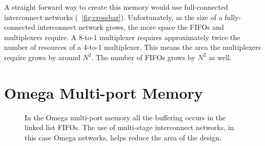     A straight forward way to create this memory would use full-connected interconnect networks (\figurename~\ref{fig:crossbar}). Unfortunately, as the size of a fully-connected interconnect network grows, the more space the FIFOs and multiplexers require. A 8-to-1 multiplexer requires approximately twice the number of resources of a 4-to-1 multiplexer. This means the area the multiplexers require grows by around $N^2$. The number of FIFOs grows by $N^2$ as well.

\section{Omega Multi-port Memory}
    \begin{figure}
        \center
        \caption[The Omega multi-port memory.]{In the Omega multi-port memory all the buffering occurs in the linked list FIFOs. The use of multi-stage interconnect networks, in this case Omega networks, helps reduce the area of the design.}
        \label{fig:versionb}
    \end{figure}
